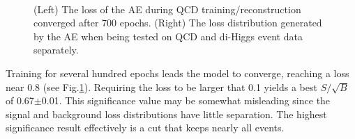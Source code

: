 \begin{figure}[!h] 
  \begin{center}
    \\
    \caption{(Left) The loss of the AE during QCD training/reconstruction converged after 700 epochs. (Right) The loss distribution generated by the AE when being tested on QCD and di-Higgs event data separately.}    
  \label{fig:ae_trainPredLoss}
\end{center}
\end{figure}

Training for several hundred epochs leads the model to converge, reaching a loss near 0.8 (see Fig.\ref{fig:ae_trainPredLoss}). Requiring the loss to be larger that 0.1 yields a best $S/\sqrt{B}$ of 0.67$\pm$0.01. This significance value may be somewhat misleading since the signal and background loss distributions have little separation. The highest significance result effectively is a cut that keeps nearly all events. 

